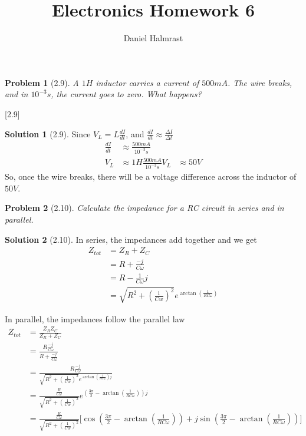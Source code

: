 \documentclass[12pt]{article}
\newtheorem*{problem}{Problem}
\theoremstyle{definition}
\newtheorem*{solution}{Solution}
\begin{document}
\title{Electronics Homework 6}
\author{Daniel Halmrast}
\maketitle

\begin{problem}[2.9]
A $1H$ inductor carries a current of $500mA$. The wire breaks, and in $10^{-3}s$, the current goes to zero. What happens? 
\end{problem}[2.9]

\begin{solution}[2.9]

Since $V_L = L\frac{dI}{dt}$, and $\frac{dI}{dt} \approx \frac{\Delta I}{\Delta t}$
\[
\begin{aligned}
\frac{dI}{dt} & \approx \frac{500mA}{10^{-3}s}\\
V_L & \approx 1H \frac{500mA}{10^{-3}s}
V_L & \approx 50V
\end{aligned}
\]
So, once the wire breaks, there will be a voltage difference across the inductor of $50V$.
\end{solution}


\begin{problem}[2.10]
Calculate the impedance for a RC circuit in series and in parallel.
\end{problem}

\begin{solution}[2.10]
In series, the impedances add together and we get
\[
\begin{aligned}
Z_{tot} & = Z_R + Z_C\\
        & = R + \frac{-j}{C\omega}\\
	& = R - \frac{1}{C\omega}j\\
	& = \sqrt{R^2+(\frac{1}{Cw})^2}e^{\arctan(\frac{1}{RC\omega})}
\end{aligned}
\]

In parallel, the impedances follow the parallel law
\[
\begin{aligned}
Z_{tot} & = \frac{Z_RZ_C}{Z_R+Z_C}\\
        & = \frac{R\frac{-j}{C\omega}}{R + \frac{-j}{C\omega}}\\
	& = \frac{R\frac{-j}{C\omega}}{\sqrt{R^2+(\frac{1}{Cw})^2}e^{\arctan(\frac{1}{RC\omega})j}}\\
	& = \tfrac{\frac{R}{C\omega}}{\sqrt{R^2+(\frac{1}{Cw})^2}}e^{(\frac{3\pi}{2} - \arctan(\frac{1}{RC\omega}))j }\\
	& = \tfrac{\frac{R}{C\omega}}{\sqrt{R^2+(\frac{1}{Cw})^2}}\Big[\cos(\frac{3\pi}{2} - \arctan(\frac{1}{RC\omega})) + j\sin(\frac{3\pi}{2} - \arctan(\frac{1}{RC\omega}))\Big]
\end{aligned}
\]
\end{solution}
\end{document}

